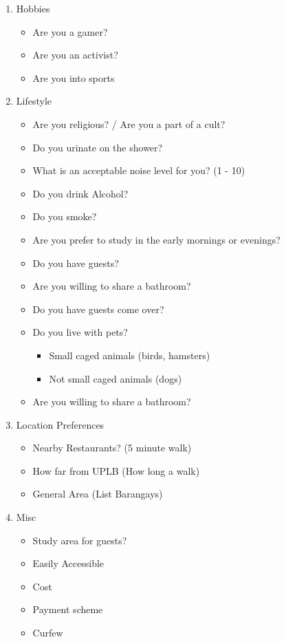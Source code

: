 \documentclass[journal]{./IEEE/IEEEtran}
\begin{document}
\begin{enumerate}
    \item Hobbies
    \begin{itemize}
        \item Are you a gamer?
        \item Are you an activist?
        \item Are you into sports
    \end{itemize}

    \item Lifestyle
    \begin{itemize}
        \item Are you religious? / Are you a part of a cult?
        \item Do you urinate on the shower?
        \item What is an acceptable noise level for you? (1 - 10)
        \item Do you drink Alcohol?
        \item Do you smoke?
        \item Are you prefer to study in the early mornings or evenings?
        \item Do you have guests?
        \item Are you willing to share a bathroom?
        \item Do you have guests come over?
        \item Do you live with pets?
        \begin{itemize}
            \item Small caged animals (birds, hamsters)
            \item Not small caged animals (dogs)
        \end{itemize}
        \item Are you willing to share a bathroom?
    \end{itemize}

    \item Location Preferences
    \begin{itemize}
        \item Nearby Restaurants? (5 minute walk)
        \item How far from UPLB (How long a walk)
        \item General Area (List Barangays)
    \end{itemize}

    \item Misc
    \begin{itemize}
        \item Study area for guests?
        \item Easily Accessible
        \item Cost
        \item Payment scheme
        \item Curfew
    \end{itemize}
\end{enumerate}
\end{document}
